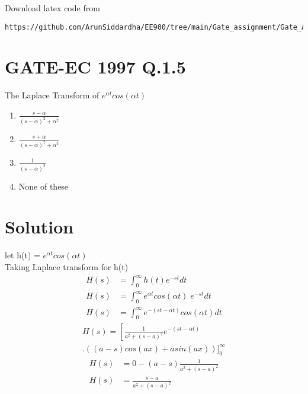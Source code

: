 \documentclass[journal,12pt,twocolumn]{IEEEtran}
\begin{document}
%
Download latex code from 
%
\begin{lstlisting}
https://github.com/ArunSiddardha/EE900/tree/main/Gate_assignment/Gate_Assignment.tex
\end{lstlisting}

\section*{GATE-EC 1997 Q.1.5}
The Laplace Transform of $e^{\alpha t}cos(\alpha t)$ 
\begin{enumerate}
    \item $\frac{s-\alpha}{(s - \alpha)^2 + \alpha^2}$\\
  \item $\frac{s+\alpha}{(s - \alpha)^2 + \alpha^2}$\\
  \item $\frac{1}{(s - \alpha)^2}$\\
  \item None of these
\end{enumerate}
\section*{Solution}
let h(t) = $e^{\alpha t}cos(\alpha t)$  \\ 
Taking Laplace transform for h(t)
\begin{align}
 H(s)&= \int_{0}^{\infty} h(t) e^{-st} dt\\
H(s)&= \int_{0}^{\infty} e^{\alpha t}cos(\alpha t)\; e^{-st} dt \\
H(s)&= \int_{0}^{\infty} e^{-(st-\alpha t)}cos(\alpha t) dt
\end{align}
\begin{multline}
  H(s) =\left[\frac{1}{ a^2 +(s-a)^2}e^{-(st-\alpha t)}\right.\\\Bigg.((a-s)cos(ax) + asin(ax))\Bigg]_{0}^{\infty} 
\end{multline} 
\begin{align}
   H(s)&=0 - (a-s) \frac{1}{ a^2 +(s-a)^2} \\
H(s) &=  \frac{s-a}{ a^2 +(s-a)^2}  
\end{align}
\end{document}
